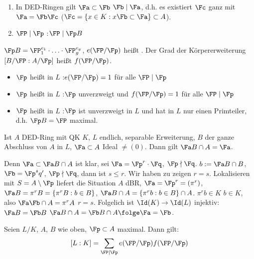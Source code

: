 \begin{Bemerkung}
 \begin{enumerate}
  \item In DED-Ringen gilt $\Fa\subset\Fb$ \gdw $\Fb\mid\Fa$, d.h. es existiert $\Fc$ ganz mit $\Fa=\Fb\Fc$ ($\Fc=\{ x\in K : x\Fb\subset \Fa\}\subset A$).
  \item $\FP\mid \Fp$ :\gdw $\FP\mid \Fp B$
 \end{enumerate}
\end{Bemerkung}

\begin{Definition}
 $\Fp B = \FP_1^{e_1}\cdot\ldots\cdot \FP_g^{e_g}$, $e(\FP/\Fp)$ heißt . Der Grad der Körpererweiterung $[B/\FP : A/\Fp]$ heißt  $f(\FP/\Fp)$.
 \begin{itemize}
  \item $\Fp$ heißt  in $L$ :\gdw $e(\FP/\Fp)=1$ für alle $\FP\mid\Fp$
  \item $\Fp$ heißt  in $L$ :\gdw $\Fp$ unverzweigt und $f(\FP/\Fp)=1$ für alle $\FP\mid\Fp$
  \item $\Fp$ heißt  in $L$ :\gdw $\Fp$ ist unverzweigt in $L$ und hat in $L$ nur einen Primteiler, d.h. $\Fp B=\FP$ maximal.
  \end{itemize}
\end{Definition}

\begin{Bemerkung}
 Ist $A$ DED-Ring mit QK $K$, $L$ endlich, separable Erweiterung, $B$ der ganze Abschluss von $A$ in $L$, $\Fa\subset A$ Ideal $\neq (0)$. Dann gilt $\Fa B\cap A=\Fa$.
 
 Denn $\Fa\subset \Fa B \cap A$ ist klar, sei $\Fa=\Fp^r\cdot\Fq$, $\Fp\nmid\Fq$. $b:=\Fa B\cap B$, $\Fb=\Fp^sq'$, $\Fp\nmid\Fq$, dann ist $s\leq r$. Wir haben zu zeigen $r=s$. Lokalisieren mit $S=A\setminus\Fp$ liefert die Situation $A$ dBR, $\Fa=\Fp^r=(\pi^r)$, $\Fa B=\pi^r B=\{ \pi^r B : b\in B\}$, $\Fa B\cap A=\{ \pi^r b : b\in B\}\cap A$. $\pi^r b\in K$ \gdw $b\in K$, also $\Fa\Fb\cap A=\pi^r A$ \folge $r=s$. Folgelich ist $\Id(K)\rightarrow \Id(L)$ injektiv: $\Fa B=\Fb B$ \folge $\Fa B\cap A=\Fb B\cap A \folge \Fa=\Fb$.
\end{Bemerkung}

\begin{Satz}
 Seien $L/K$, $A$, $B$ wie oben, $\Fp\subset A$ maximal. Dann gilt:
 \[ [L:K] = \sum_{\FP\mid\Fp} e(\FP/\Fp)f(\FP/\Fp)\]
\end{Satz}
